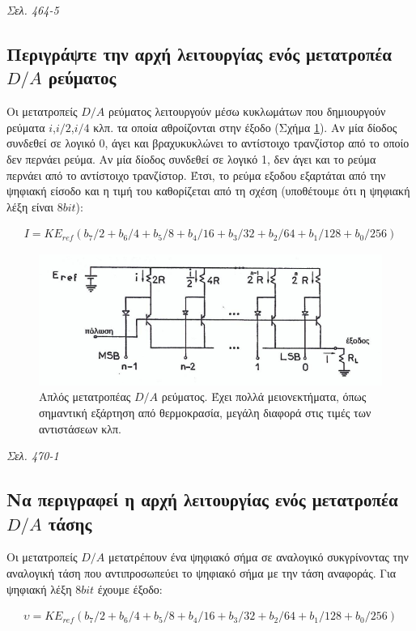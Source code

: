 \documentclass{article}
\begin{document}
\emph{Σελ. 464-5}

\subsection{Περιγράψτε την αρχή λειτουργίας ενός μετατροπέα $D/A$ ρεύματος}
Οι μετατροπείς $D/A$ ρεύματος λειτουργούν μέσω κυκλωμάτων που δημιουργούν ρεύματα $i$,$i/2$,$i/4$ κλπ. τα οποία αθροίζονται στην έξοδο (Σχήμα \ref{DArevmatos}). Αν μία δίοδος συνδεθεί σε λογικό 0, άγει και 
βραχυκυκλώνει το αντίστοιχο τρανζίστορ από το οποίο δεν περνάει ρεύμα. Αν μία δίοδος συνδεθεί σε λογικό 1, δεν άγει και το ρεύμα περνάει από το αντίστοιχο τρανζίστορ. Έτσι, το 
ρεύμα εξοδου εξαρτάται από την ψηφιακή είσοδο και η τιμή του καθορίζεται από τη σχέση (υποθέτουμε ότι η ψηφιακή λέξη είναι $8 bit$):

\begin{align*}
    I = K E_{ref} \left( b_7/2 + b_6/4 + b_5/8 + b_4/16 +b_3/32 + b_2/64 + b_1/128 + b_0/256 \right)
\end{align*}

\begin{figure}[h!]
    \includegraphics[width=\linewidth]{DArevma.png}
    \caption{Απλός μετατροπέας $D/A$ ρεύματος. Έχει πολλά μειονεκτήματα, όπως σημαντική εξάρτηση από θερμοκρασία, μεγάλη διαφορά στις τιμές των αντιστάσεων κλπ.}
    \label{DArevmatos}
\end{figure}

\emph{Σελ. 470-1}

\subsection{Να περιγραφεί η αρχή λειτουργίας ενός μετατροπέα $D/A$ τάσης}
Οι μετατροπείς $D/A$ μετατρέπουν ένα ψηφιακό σήμα σε αναλογικό συκγρίνοντας την αναλογική τάση που αντιπροσωπεύει το ψηφιακό σήμα με την τάση αναφοράς. Για ψηφιακή λέξη $8bit$ έχουμε
έξοδο: 

\begin{align*}
    \upsilon = K E_{ref} \left( b_7/2 + b_6/4 + b_5/8 + b_4/16 +b_3/32 + b_2/64 + b_1/128 + b_0/256 \right)
\end{align*}
\end{document}

